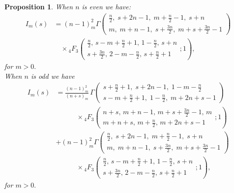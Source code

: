 \documentclass{article}
\theoremstyle{boldremark}
\newtheorem{proposition}{Proposition}[section]
\renewcommand\[{\begin{equation}}
\renewcommand\]{\end{equation}}
\theoremstyle{definition}
\numberwithin{equation}{section}
\begin{document}
  \begin{proposition}\label{Pro 3.1}
      When $n$ is even we have:
      \begin{align} \label{sude}
I_m(s) &= (n-1)_m^2  \Gamma\!\left(
\begin{matrix}
\frac{n}{2},\; s+2n-1,\; m+\frac{n}{2}-1,\; s+n
\\
m,\; m+n-1,\; s+\frac{3n}{2},\; m+s+\frac{3n}{2}-1
\end{matrix}
\right) \nonumber \\[3. pt]
&\quad \times {}_4F_3 \left( \begin{matrix} \frac{n}{2}, \, s - m + \frac{n}{2} + 1, \, 1 - \frac{n}{2}, \, s + n \\ s + \frac{3n}{2}, \, 2 - m - \frac{n}{2}, \, s + \frac{n}{2} + 1 \end{matrix} ; 1 \right),
      \end{align}
      for $m >0.$\\
      When $n$ is odd we have 
\begin{align} 
I_m(s) &= \frac{(n-1)_m^2}{(n+s)_m}\,
\Gamma\!\left(
\begin{matrix}
s+\frac{n}{2}+1,\; s+2n-1,\; 1-m-\frac{n}{2}
\\
s-m+\frac{n}{2}+1,\; 1-\frac{n}{2},\; m+2n+s-1
\end{matrix}
\right) \label{liche} \\[3. pt]
&\qquad \quad \times {}_4F_3 \left( \begin{matrix} n + s, \, m + n - 1, \, m + s + \frac{3n}{2} - 1, \, m \\ m + n + s, \, m + \frac{n}{2}, \, m + 2n + s - 1 \end{matrix} ; 1 \right) \nonumber \\[1em]
& + (n-1)_m^2  \Gamma\!\left(
\begin{matrix}
\frac{n}{2},\; s+2n-1,\; m+\frac{n}{2}-1,\; s+n
\\
m,\; m+n-1,\; s+\frac{3n}{2},\; m+s+\frac{3n}{2}-1
\end{matrix}
\right) \nonumber \\[3. pt]
&\qquad \quad \times {}_4F_3 \left( \begin{matrix} \frac{n}{2}, \, s - m + \frac{n}{2} + 1, \, 1 - \frac{n}{2}, \, s + n \\ s + \frac{3n}{2}, \, 2 - m - \frac{n}{2}, \, s + \frac{n}{2} + 1 \end{matrix} ; 1 \right) \nonumber,
\end{align}
for $m >0.$
  \end{proposition}
\end{document}
